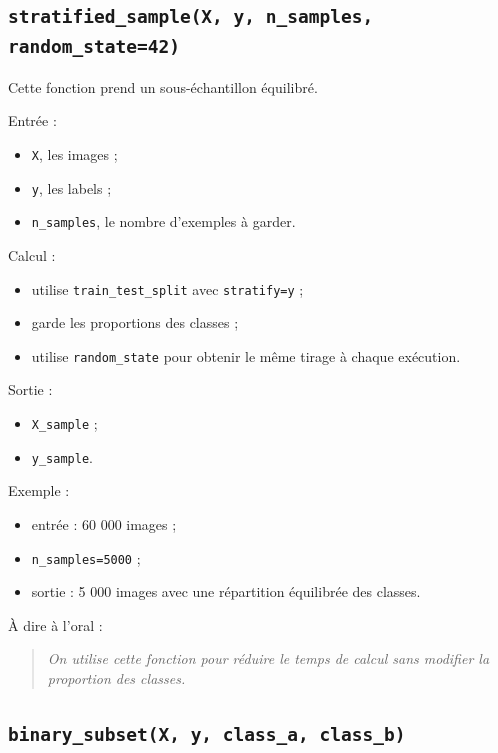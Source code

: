 \documentclass[11pt,a4paper]{article}
\begin{document}
\subsection{\texttt{stratified\_sample(X, y, n\_samples, random\_state=42)}}

Cette fonction prend un sous-échantillon équilibré.

Entrée :

\begin{itemize}
\item \texttt{X}, les images ;
\item \texttt{y}, les labels ;
\item \texttt{n\_samples}, le nombre d'exemples à garder.
\end{itemize}

Calcul :

\begin{itemize}
\item utilise \texttt{train\_test\_split} avec \texttt{stratify=y} ;
\item garde les proportions des classes ;
\item utilise \texttt{random\_state} pour obtenir le même tirage à chaque exécution.
\end{itemize}

Sortie :

\begin{itemize}
\item \texttt{X\_sample} ;
\item \texttt{y\_sample}.
\end{itemize}

Exemple :

\begin{itemize}
\item entrée : 60 000 images ;
\item \texttt{n\_samples=5000} ;
\item sortie : 5 000 images avec une répartition équilibrée des classes.
\end{itemize}

À dire à l'oral :

\begin{quote}
\itshape On utilise cette fonction pour réduire le temps de calcul sans modifier la proportion des classes.
\end{quote}

\subsection{\texttt{binary\_subset(X, y, class\_a, class\_b)}}
\end{document}
